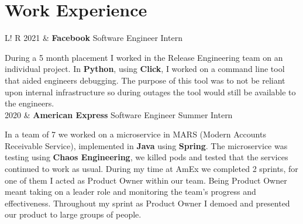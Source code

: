 \documentclass[10pt, a4paper]{article}
\newcommand\vsep{\color{lightgray} \vrule width 0.5pt}
\newcommand\sect[1]{\section*{\hspace{.05cm} \Large\sc #1}}
\newcommand\tspace{\hfill}
\begin{document}
        \sect{Work Experience}
            \begin{tabular}{L!{\vsep}R}
                2021 & {\textbf{Facebook}} \tspace Software Engineer Intern
                    \smallskip

                    During a 5 month placement I worked in the Release Engineering team on an individual project. In \textbf{Python}, using \textbf{Click}, I worked on a command line tool that aided engineers debugging. The purpose of this tool was to not be reliant upon internal infrastructure so during outages the tool would still be available to the engineers. 
                \\
                2020 & {\textbf{American Express}} \tspace Software Engineer Summer Intern 
                    \smallskip

                    In a team of 7 we worked on a microservice in MARS (Modern Accounts Receivable Service), implemented in \textbf{Java} using \textbf{Spring}. The microservice was testing using \textbf{Chaos Engineering}, we killed pods and tested that the services continued to work as usual. During my time at AmEx we completed 2 sprints, for one of them I acted as Product Owner within our team. Being Product Owner meant taking on a leader role and monitoring the team's progress and effectiveness. Throughout my sprint as Product Owner I demoed and presented our product to large groups of people.
                    \smallskip
            \end{tabular}
            \vspace{0.5\baselineskip}
\end{document}
